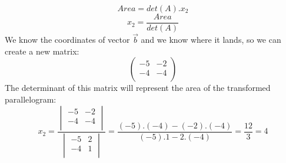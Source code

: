 \documentclass[600paper, 11pt,twoside,openany]{kdp}
\begin{document}
\[Area = det(A).x_2\]
\[x_2 = \frac{Area}{det(A)}\]
\indent We know the coordinates of vector $\overrightarrow{b}$ and we know where it lands, so we can create a new matrix:
\[\begin{pmatrix}
-5 & -2  \\
-4 & -4 \\
\end{pmatrix}
\]
\indent The determinant of this matrix will represent the area of the transformed parallelogram:
\[
x_2 = \frac{\begin{vmatrix}
-5 & -2  \\
-4 & -4 \\
\end{vmatrix} }{\begin{vmatrix}
-5 & 2  \\
-4 & 1 \\
\end{vmatrix}} = \frac{(-5).(-4) - (-2).(-4)}{(-5).1 -2.(-4)} = \frac{12}{3} = 4 
\]
\end{document}
